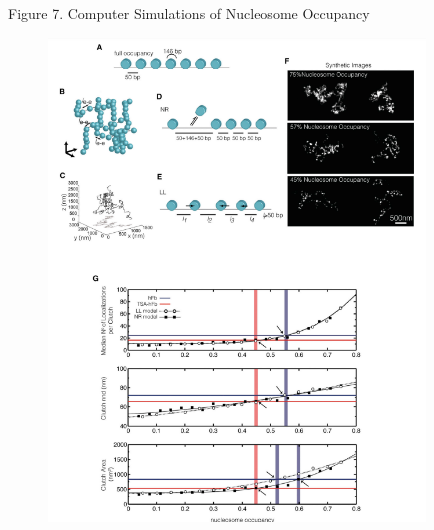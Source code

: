 \documentclass{beamer}			%
\begin{document}
\begin{frame}{Figure 7. Computer Simulations of Nucleosome Occupancy}
\begin{figure}
\includegraphics[width=10cm]{Figure-7.png}
\end{figure}
\end{frame}
\end{document}
